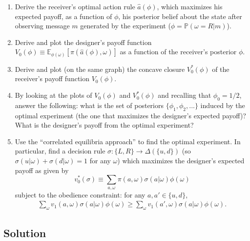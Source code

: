 \documentclass[a4paper]{article}
\newif\ifsolutions
\begin{document}
	\begin{enumerate}
		\item Derive the receiver's optimal action rule $\hat{a}(\phi)$, which maximizes his expected payoff, as a function of $\phi$, his posterior belief about the state after observing message $m$ generated by the experiment ($\phi = \mathbb{P} (\omega=R | m)$).
		\item Derive and plot the designer's payoff function $V_0(\phi) \equiv \mathbb{E}_{\phi(\omega)} \left[\pi (\hat{a}(\phi), \omega)\right]$ as a function of the receiver's posterior $\phi$.
		\item Derive and plot (on the same graph) the concave closure $V_0^* (\phi)$ of the receiver's payoff function $V_0(\phi)$.
		\item By looking at the plots of $V_0(\phi)$ and $V_0^* (\phi)$ and recalling that $\phi_0 = 1/2$, answer the following: what is the set of posteriors $\{\phi_1, \phi_2, ...\}$ induced by the optimal experiment (the one that maximizes the designer's expected payoff)? What is the designer's payoff from the optimal experiment?
		\item Use the ``correlated equilibria approach'' to find the optimal experiment. In particular, find a decision rule $\sigma: \{L,R\} \to \varDelta(\{u,d\})$ (so $\sigma(u|\omega)+\sigma(d|\omega)=1$ for any $\omega$) which maximizes the designer's expected payoff as given by
		\begin{equation*}
			v_0^* (\sigma) \equiv  \sum_{a,\omega} \pi(a,\omega) \sigma (a | \omega) \phi(\omega)
		\end{equation*}
		subject to the obedience constraint: for any $a,a' \in \{u,d\}$,
		\begin{align*}
			\sum_{\omega} v_1 (a, \omega) \sigma (a | \omega) \phi(\omega) 
			\geq \sum_{\omega} v_1 (a', \omega) \sigma (a | \omega) \phi(\omega) .
		\end{align*} 
	\end{enumerate}
	
	
\ifsolutions
\subsection*{Solution}
\end{document}
